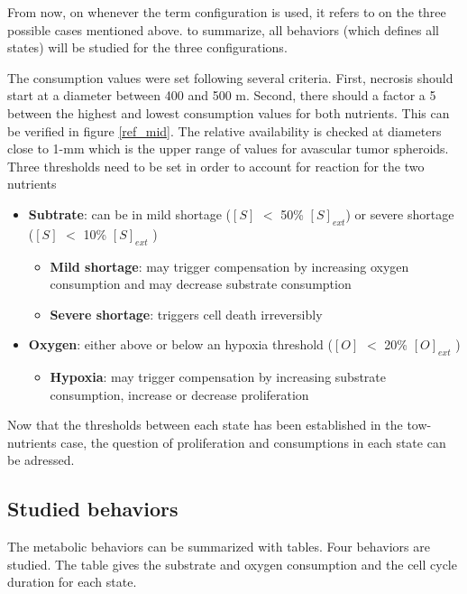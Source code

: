 \documentclass[11pt,a4paper]{article}
\begin{document}
From now, on whenever the term configuration is used, it refers to on the three possible cases mentioned above. to summarize, all behaviors (which defines all states) will be studied for the three configurations.

The consumption values were set following several criteria. First, necrosis should start at a diameter between 400 and 500 \textmu m\cite{Freyer1986}\cite{Freyer1988}. Second, there should a factor a 5 between the highest and lowest consumption values for both nutrients.\cite{Kammerer2015} This can be verified in figure \ref{ref_mid}. The relative availability is checked at diameters close to 1-mm which is the upper range of values for avascular tumor spheroids.\cite{Freyer1986}\cite{MullerKlieser1986}\\
Three thresholds need to be set in order to account for reaction for the two nutrients
\begin{itemize}
\item \textbf{Subtrate}: can be in mild shortage ($[S]$  $<$ 50\% $[S]_{ext}$) or severe shortage ($[S]$  $<$ 10\% $[S]_{ext}$  )

\begin{itemize}
\item \textbf{Mild shortage}: may trigger compensation by increasing oxygen consumption and may decrease substrate consumption
\item \textbf{Severe shortage}: triggers cell death irreversibly
\end{itemize}

\item  \textbf{Oxygen}: either above or below an hypoxia threshold ($[O]$  $<$ 20\% $[O]_{ext}$ )
\begin{itemize}
\item \textbf{Hypoxia}: may trigger compensation by increasing substrate consumption, increase or decrease proliferation
\end{itemize}
\end{itemize}


Now that the thresholds between each state has been established in the tow-nutrients case, the question of proliferation and consumptions in each state can be adressed.\\
\newpage
\subsection{Studied behaviors}
The metabolic behaviors can be summarized with tables. Four behaviors are studied. The table gives the substrate and oxygen consumption and the cell cycle duration for each state.\\
\end{document}
